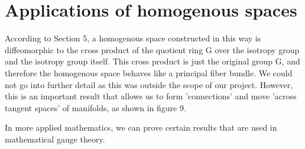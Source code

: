 \documentclass[12pt,twoside]{article}
\begin{document}
\section{Applications of homogenous spaces}

According to Section 5, a homogenous space constructed in this way is diffeomorphic to the cross product of the quotient ring G over the isotropy group and the isotropy group itself. This cross product is just the original group G, and therefore the homogenous space behaves like a principal fiber bundle. We could not go into further detail as this was outside the scope of our project. 
However, this is an important result that allows us to form 'connections' and move 'across tangent spaces' of manifolds, as shown in figure 9. \cite{geom homog}

In more applied mathematics, we can prove certain results that are used in mathematical gauge theory.
\end{document}
